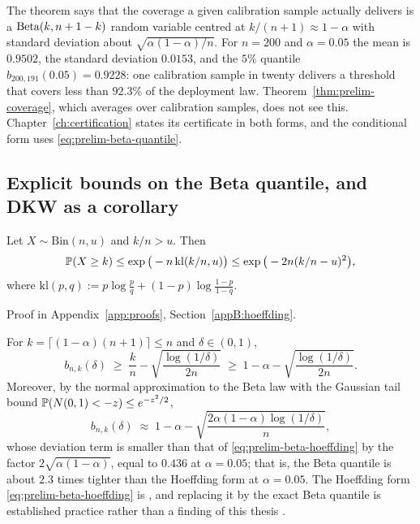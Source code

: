 \documentclass[../../../main.tex]{subfiles}
\begin{document}
The theorem says that the coverage a given calibration sample actually delivers is a $\operatorname{Beta}(k,n+1-k)$ random variable centred at $k/(n+1)\approx1-\alpha$ with standard deviation about $\sqrt{\alpha(1-\alpha)/n}$. For $n=200$ and $\alpha=0.05$ the mean is $0.9502$, the standard deviation $0.0153$, and the $5\%$ quantile $b_{200,191}(0.05)=0.9228$: one calibration sample in twenty delivers a threshold that covers less than $92.3\%$ of the deployment law. Theorem~\ref{thm:prelim-coverage}, which averages over calibration samples, does not see this. Chapter~\ref{ch:certification} states its certificate in both forms, and the conditional form uses \eqref{eq:prelim-beta-quantile}.

\subsection{Explicit bounds on the Beta quantile, and DKW as a corollary}

\begin{lemma}\label{lem:prelim-hoeffding}
Let $X\sim\mathrm{Bin}(n,u)$ and $k/n>u$. Then
\[
\mathbb{P}(X\ge k)\le\exp\big(-n\,\mathrm{kl}(k/n,u)\big)\le\exp\big(-2n(k/n-u)^2\big),
\]
where $\mathrm{kl}(p,q):=p\log\frac pq+(1-p)\log\frac{1-p}{1-q}$.
\end{lemma}

Proof in Appendix~\ref{app:proofs}, Section~\ref{appB:hoeffding}.

\begin{corollary}\label{cor:prelim-beta-bound}
For $k=\lceil(1-\alpha)(n+1)\rceil\le n$ and $\delta\in(0,1)$,
\begin{equation}\label{eq:prelim-beta-hoeffding}
b_{n,k}(\delta)\;\ge\;\frac kn-\sqrt{\frac{\log(1/\delta)}{2n}}\;\ge\;1-\alpha-\sqrt{\frac{\log(1/\delta)}{2n}} .
\end{equation}
Moreover, by the normal approximation to the Beta law with the Gaussian tail bound $\mathbb{P}(N(0,1)<-z)\le e^{-z^2/2}$,
\begin{equation}\label{eq:prelim-beta-normal}
b_{n,k}(\delta)\;\approx\;1-\alpha-\sqrt{\frac{2\alpha(1-\alpha)\log(1/\delta)}{n}},
\end{equation}
whose deviation term is smaller than that of \eqref{eq:prelim-beta-hoeffding} by the factor $2\sqrt{\alpha(1-\alpha)}$, equal to $0.436$ at $\alpha=0.05$; that is, the Beta quantile is about $2.3$ times tighter than the Hoeffding form at $\alpha=0.05$. The Hoeffding form \eqref{eq:prelim-beta-hoeffding} is \cite[Prop.~2a, p.~478]{vovk2012}, and replacing it by the exact Beta quantile is established practice rather than a finding of this thesis \citep[Sec.~2.2]{zwart2025}.
\end{corollary}
\end{document}
